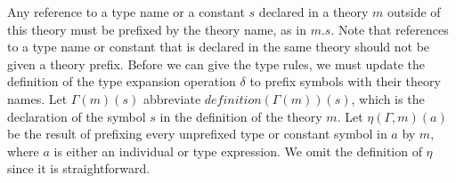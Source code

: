 \documentclass [12pt,twoside]{cslreport}
\newcommand{\aro}{\mathord\rightarrow} %
\newcommand{\funtype}[2]{[#1 \aro #2]}
\newcommand{\tupletype}[1]{[#1]}
\newcommand{\itdef}{\textit{definition}}
\begin{document}
\begin{comment}
Perhaps each declaration should be required to introduce a new
symbol so that there is no confusion between $\Gamma$ and $\gamma$.
\end{comment}

\begin{comment}
Example:
bool: TYPE,
integer : THEORY = (integer: TYPE, + :
\funtype{\tupletype{integer, integer}}{ {\tt integer}}),
natural : THEORY = (nat : TYPE)
\end{comment}

Any reference to a type name or a constant $s$ declared in a theory $m$
outside of this theory must be prefixed by the theory name, as in $m.s$\@.
Note that references to a type name or constant that is declared in the
same theory 
should not be given a theory prefix.  Before we can give the type rules, we
must update the definition of the type expansion
operation $\delta$ to prefix symbols with their theory names.
Let $\Gamma(m)(s)$  abbreviate $ \itdef{}(\Gamma(m))(s)$, which is
the declaration of the symbol $s$ in the definition of the theory $m$\@.
Let $\eta(\Gamma, m)(a)$ be the result of prefixing every unprefixed type or
constant symbol in $a$ by $m$, where $a$ is either an individual or type
expression.  We omit the definition of $\eta$ since it is straightforward.
  
\end{document}
